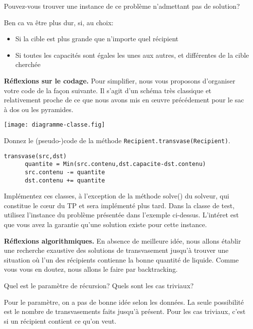 \documentclass[10pt]{article}\usepackage[correction,nu]{esial}%
\begin{document}
\Question Pouvez-vous trouver une instance de ce problème n'admettant pas de
solution?
\begin{Reponse}
  \noindent
  Ben ca va être plus dur, si, au choix:
  \begin{itemize}
  \item Si la cible est plus grande que n'importe quel récipient
  \item Si toutes les capacités sont égales les unes aux autres, et différentes
    de la cible cherchée
  \end{itemize}
\end{Reponse}

\Exercice\textbf{Réflexions sur le codage.}  Pour simplifier, nous vous
proposons d'organiser votre code de la façon suivante. Il s'agit d'un schéma
très classique et relativement proche de ce que nous avons mis en œuvre
précédement pour le sac à dos ou les pyramides.

\noindent\texttt{[image: diagramme-classe.fig]}

\Question Donnez le (pseudo-)code de la méthode \texttt{Recipient.transvase(Recipient)}.

\begin{Reponse}
  \begin{Verbatim}[gobble=4]
    transvase(src,dst)
      quantite = Min(src.contenu,dst.capacite-dst.contenu)
      src.contenu -= quantite
      dst.contenu += quantite
  \end{Verbatim}
\end{Reponse}
\Question Implémentez ces classes, à l'exception de la méthode solve() du
solveur, qui constitue le cœur du TP et sera implémenté plus tard. Dans la
classe de test, utilisez l'instance du problème présentée dans l'exemple
ci-dessus. L'intéret est que vous avez la garantie qu'une solution existe pour
cette instance.

\Exercice\textbf{Réflexions algorithmiques.}  En absence de meilleure idée, nous
allons établir une recherche exaustive des solutions de transvasement jusqu'à
trouver une situation où l'un des récipients contienne la bonne quantité de
liquide. Comme vous vous en doutez, nous allons le faire par backtracking.

\Question Quel est le paramètre de récursion? Quels sont les cas triviaux?

\begin{Reponse}
  Pour le paramètre, on a pas de bonne idée selon les données. La seule
  possibilité est le nombre de transvasements faits jusqu'à présent. 
  Pour les cas triviaux, c'est si un récipient contient ce qu'on veut.
\end{Reponse}
\end{document}
